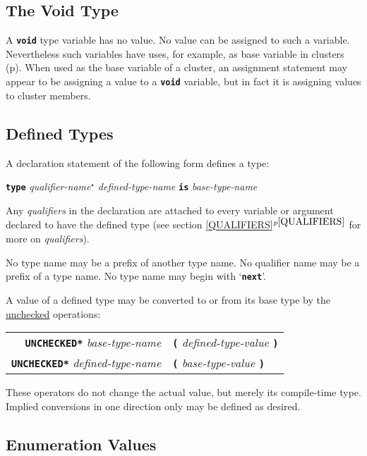 \documentclass[12pt]{article}
\makeatletter
\newcommand{\TT}[1]{{\tt \bfseries #1}}
\newcommand{\ttkey}[1]{\TT{#1}\index{#1@{\tt #1}}}
\newcommand{\itemref}[1]{\ref{#1}$^{p\pageref{#1}}$}
\newcommand{\pagref}[1]{p\pageref{#1}}
\newcommand{\STAR}{{\Large $^\star$}}
\makeatother
\begin{document}
\subsection{The Void Type}
\label{THE-VOID-TYPE}

A \ttkey{void} type variable has no value.  No value can be
assigned to such a variable.  Nevertheless such variables have
uses, for example, as base variable in clusters (\pagref{CLUSTERS}).
When used as the base variable of a cluster, an assignment statement
may appear to be assigning a value to a \TT{void} variable, but
in fact it is assigning values to cluster members.

\subsection{Defined Types}
\label{DEFINED-TYPES}

A declaration statement of the following form defines a type:
\begin{center}
\TT{type} {\em qualifier-name}\STAR{} {\em defined-type-name}
          \TT{is} {\em base-type-name}
\end{center}

Any {\em qualifiers} in the declaration are attached to every
variable or argument declared to have the defined type (see
section \itemref{QUALIFIERS} for more on {\em qualifiers}).

No type name may be a prefix of another type name.
No qualifier name may be a prefix of a type name.
No type name may begin with `\TT{next}'.

A value of a defined type may be converted to or from its base
type by the
\underline{unchecked}
operations:
\begin{center}
\begin{tabular}{r@{~}l}
\TT{*UNCHECKED*} {\em base-type-name}
	& \TT{(} {\em defined-type-value} \TT{)}\\
\TT{*UNCHECKED*} {\em defined-type-name}
	& \TT{(} {\em base-type-value} \TT{)}\\
\end{tabular}\label{DEFINED-TYPE-UNCHECKED-CONVERSION}
\end{center}
These operators do not change the actual value, but merely its
compile-time type.  Implied conversions in one direction only
may be defined as desired.


\subsection{Enumeration Values}
\label{Enumeration-VALUES}
\end{document}
